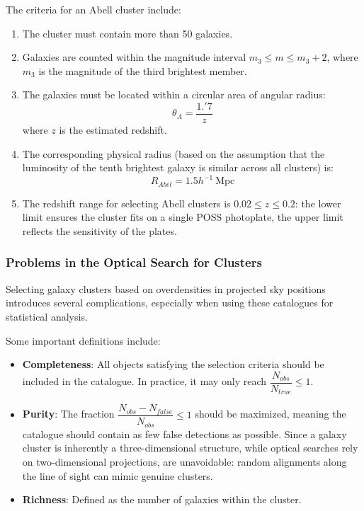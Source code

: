 The criteria for an Abell cluster include:
\begin{enumerate}
    \item The cluster must contain more than 50 galaxies.
    \item Galaxies are counted within the magnitude interval $m_3 \leq m \leq m_3+2$, where $m_3$ is the magnitude of the third brightest member.
    \item The galaxies must be located within a circular area of angular radius:
    $$
    \theta_A = \frac{1.'7}{z}
    $$
    where $z$ is the estimated redshift.

    \item The corresponding physical radius (based on the assumption that the luminosity of the tenth brightest galaxy is similar across all clusters) is:
    $$
    R_{Abel} = 1.5 h^{-1}~\mathrm{Mpc}
    $$

    \item The redshift range for selecting Abell clusters is $0.02 \leq z \leq 0.2$: the lower limit ensures the cluster fits on a single POSS photoplate, the upper limit reflects the sensitivity of the plates.
\end{enumerate}

\subsubsection{Problems in the Optical Search for Clusters}

Selecting galaxy clusters based on overdensities in projected sky positions introduces several complications, especially when using these catalogues for statistical analysis.

Some important definitions include:
\begin{itemize}
    \item \textbf{Completeness}: All objects satisfying the selection criteria should be included in the catalogue. In practice, it may only reach $\dfrac{N_{obs}}{N_{true}} \le 1$.
    \item \textbf{Purity}: The fraction $\dfrac{N_{obs} - N_{false}}{N_{obs}} \le 1$ should be maximized, meaning the catalogue should contain as few false detections as possible.
    Since a galaxy cluster is inherently a three-dimensional structure, while optical searches rely on two-dimensional projections,  are unavoidable: random alignments along the line of sight can mimic genuine clusters.

    \item \textbf{Richness}: Defined as the number of galaxies within the cluster.
\end{itemize}

